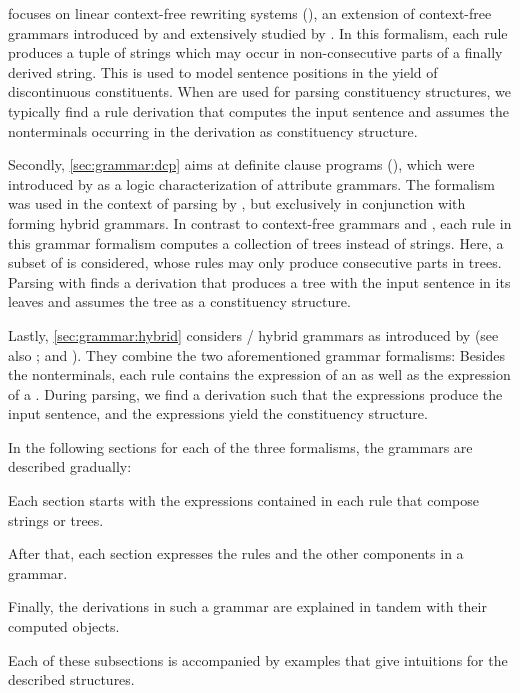 \documentclass[../document.tex]{subfiles}
\begin{document}
     focuses on linear context-free rewriting systems (), an extension of context-free grammars introduced by \citet{VijWeiJos87} and extensively studied by \citet{SekMatFujKas91}.
    In this formalism, each rule produces a tuple of strings which may occur in non-consecutive parts of a finally derived string.
    This is used to model sentence positions in the yield of discontinuous constituents.
    When  are used for parsing constituency structures, we typically find a rule derivation that computes the input sentence and assumes the nonterminals occurring in the derivation as constituency structure.

    Secondly, \cref{sec:grammar:dcp} aims at definite clause programs (), which were introduced by \citet{Der85} as a logic characterization of attribute grammars.
    The formalism was used in the context of parsing by \citet{Ned14}, but exclusively in conjunction with  forming hybrid grammars.
    In contrast to context-free grammars and , each rule in this grammar formalism computes a collection of trees instead of strings.
    Here, a subset of  is considered, whose rules may only produce consecutive parts in trees.
    Parsing with  finds a derivation that produces a tree with the input sentence in its leaves and assumes the tree as a constituency structure.

    Lastly, \cref{sec:grammar:hybrid} considers / hybrid grammars as introduced by \citet{Ned14} (see also \citealp{Geb17}; and \citealp{Geb20}).
    They combine the two aforementioned grammar formalisms:
        Besides the nonterminals, each rule contains the expression of an  as well as the expression of a .
    During parsing, we find a derivation such that the  expressions produce the input sentence, and the  expressions yield the constituency structure.

    In the following sections for each of the three formalisms, the grammars are described gradually:
    \begin{inparaenum}
        \item Each section starts with the expressions contained in each rule that compose strings or trees.
        \item After that, each section expresses the rules and the other components in a grammar.
        \item Finally, the derivations in such a grammar are explained in tandem with their computed objects.
    \end{inparaenum}
    Each of these subsections is accompanied by examples that give intuitions for the described structures.

    
    
    

    \ifSubfilesClassLoaded{%
        \printindex
    }{}
\end{document}
